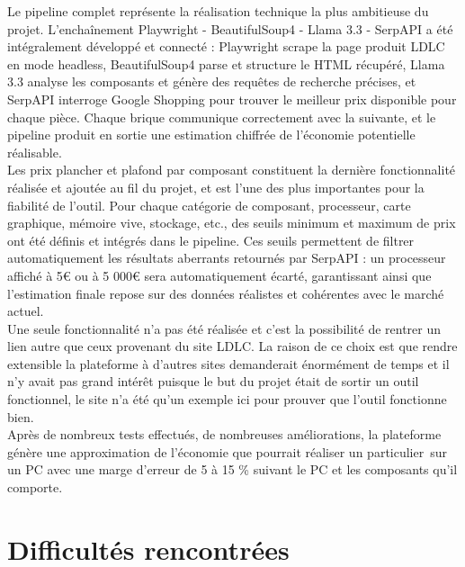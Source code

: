 \documentclass[a4paper, 12pt, twoside]{article}
\begin{document}
Le pipeline complet représente la réalisation technique la plus ambitieuse du projet. L'enchaînement Playwright - BeautifulSoup4 - Llama 3.3 - SerpAPI a été intégralement développé et connecté : Playwright scrape la page produit LDLC en mode headless, BeautifulSoup4 parse et structure le HTML récupéré, Llama 3.3 analyse les composants et génère des requêtes de recherche précises, et SerpAPI interroge Google Shopping pour trouver le meilleur prix disponible pour chaque pièce. Chaque brique communique correctement avec la suivante, et le pipeline produit en sortie une estimation chiffrée de l'économie potentielle réalisable.\\
Les prix plancher et plafond par composant constituent la dernière fonctionnalité réalisée et ajoutée au fil du projet, et est l'une des plus importantes pour la fiabilité de l'outil. Pour chaque catégorie de composant, processeur, carte graphique, mémoire vive, stockage, etc., des seuils minimum et maximum de prix ont été définis et intégrés dans le pipeline. Ces seuils permettent de filtrer automatiquement les résultats aberrants retournés par SerpAPI : un processeur affiché à 5€ ou à 5 000€ sera automatiquement écarté, garantissant ainsi que l'estimation finale repose sur des données réalistes et cohérentes avec le marché actuel.\\

Une seule fonctionnalité n'a pas été réalisée et c'est la possibilité de rentrer un lien autre que ceux provenant du site LDLC. La raison de ce choix est que rendre extensible la plateforme à d'autres sites demanderait énormément de temps et il n'y avait pas grand intérêt puisque le but du projet était de sortir un outil fonctionnel, le site n'a été qu'un exemple ici pour prouver que l'outil fonctionne bien. \\

Après de nombreux tests effectués, de nombreuses améliorations, la plateforme génère une approximation de l’économie que pourrait réaliser un particulier sur un PC avec une marge d’erreur de 5 à 15 \% suivant le PC et les composants qu'il comporte.

\newpage

\section{Difficultés rencontrées}
\end{document}
